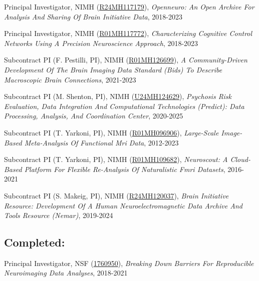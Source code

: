 \documentclass[10pt, letterpaper]{article}
\begin{document}
Principal Investigator, NIMH (\href{http://projectreporter.nih.gov/project_info_description.cfm?aid=9770947}{R24MH117179}), \textit{Openneuro: An Open Archive For Analysis And Sharing Of Brain Initiative Data}, 2018-2023 \vspace{2mm}

Principal Investigator, NIMH (\href{http://projectreporter.nih.gov/project_info_description.cfm?aid=9906911}{R01MH117772}), \textit{Characterizing Cognitive Control Networks Using A Precision Neuroscience Approach}, 2018-2023 \vspace{2mm}

Subcontract PI (F. Pestilli, PI), NIMH (\href{https://reporter.nih.gov/project-details/10253558}{R01MH126699}), \textit{A Community-Driven Development Of The Brain Imaging Data Standard (Bids) To Describe Macroscopic Brain Connections}, 2021-2023 \vspace{2mm}

Subcontract PI (M. Shenton, PI), NIMH (\href{https://reporter.nih.gov/project-details/10092398}{U24MH124629}), \textit{Psychosis Risk Evaluation, Data Integration And Computational Technologies (Predict): Data Processing, Analysis, And Coordination Center}, 2020-2025 \vspace{2mm}

Subcontract PI (T. Yarkoni, PI), NIMH (\href{https://projectreporter.nih.gov/project_info_description.cfm?aid=9881347}{R01MH096906}), \textit{Large-Scale Image-Based Meta-Analysis Of Functional Mri Data}, 2012-2023 \vspace{2mm}

Subcontract PI (T. Yarkoni, PI), NIMH (\href{https://projectreporter.nih.gov/project_info_description.cfm?aid=9742532}{R01MH109682}), \textit{Neuroscout: A Cloud-Based Platform For Flexible Re-Analysis Of Naturalistic Fmri Datasets}, 2016-2021 \vspace{2mm}

Subcontract PI (S. Makeig, PI), NIMH (\href{http://projectreporter.nih.gov/project_info_description.cfm?aid=9795341}{R24MH120037}), \textit{Brain Initiative Resource: Development Of A Human Neuroelectromagnetic Data Archive And Tools Resource (Nemar)}, 2019-2024 \vspace{2mm}

\subsection*{Completed:}

Principal Investigator, NSF (\href{http://www.nsf.gov/awardsearch/showAward?AWD_ID=1760950&HistoricalAwards=false}{1760950}), \textit{Breaking Down Barriers For Reproducible Neuroimaging Data Analyses}, 2018-2021 \vspace{2mm}
\end{document}

